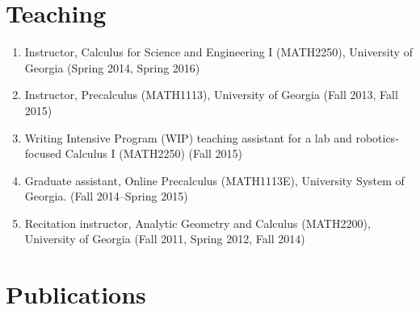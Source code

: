 \documentclass[letterpaper]{article}
\begin{document}
\section*{Teaching}

\begin{enumerate}
\item Instructor, Calculus for Science and Engineering I (MATH2250), University of Georgia (Spring 2014, Spring 2016)
\item Instructor, Precalculus (MATH1113), University of Georgia (Fall 2013, Fall 2015)
\item Writing Intensive Program (WIP) teaching assistant for a lab and robotics-focused Calculus I (MATH2250) (Fall 2015)
\item Graduate assistant, Online
  Precalculus (MATH1113E), University System of Georgia. (Fall 2014--Spring 2015)
\item Recitation instructor, Analytic Geometry and Calculus
  (MATH2200), University of Georgia (Fall 2011, Spring 2012, Fall 2014)
\end{enumerate}

\section*{Publications}
\end{document}
